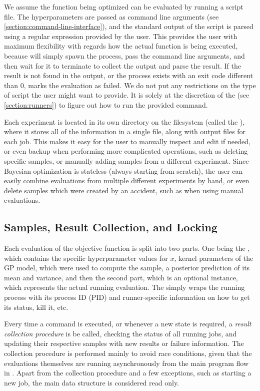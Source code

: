 We assume the function being optimized can be evaluated by running a script file. The hyperparameters are passed as command line arguments (see \autoref{section:command-line-interface}), and the standard output of the script is parsed using a regular expression provided by the user. This provides the user with maximum flexibility with regards how the actual function is being executed, because \bopt will simply spawn the process, pass the command line arguments, and then wait for it to terminate to collect the output and parse the result. If the result is not found in the output, or the process exists with an exit code different than $0$, \bopt marks the evaluation as failed. We do not put any restrictions on the type of script the user might want to provide. It is solely at the discretion of the  (see \autoref{section:runners}) to figure out how to run the provided command.

Each \bopt experiment is located in its own directory on the filesystem (called the ), where it stores all of the information in a single  file, along with output files for each job. This makes it easy for the user to manually inspect and edit if needed, or even backup when performing more complicated operations, such as deleting specific samples, or manually adding samples from a different experiment. Since Bayesian optimization is stateless (always starting from scratch), the user can easily combine evaluations from multiple different experiments by hand, or even delete samples which were created by an accident, such as when using manual evaluations.


\subsection{Samples, Result Collection, and Locking}

Each evaluation of the objective function is split into two parts. One being the , which contains the specific hyperparameter values for $x$, kernel parameters of the GP model, which were used to compute the sample, a posterior prediction of its mean and variance, and then the second part, which is an optional  instance, which represents the actual running evaluation. The  simply wraps the running process with its process ID (PID) and runner-specific information on how to get its status, kill it, etc.

Every time a \bopt command is executed, or whenever a new state is required, a \emph{result collection procedure} is be called, checking the status of all running jobs, and updating their respective samples with new results or failure information. The collection procedure is performed mainly to avoid race conditions, given that the evaluations themselves are running asynchronously from the main program flow in \bopt. Apart from the collection procedure and a few exceptions, such as starting a new job, the main data structure is considered read only.

